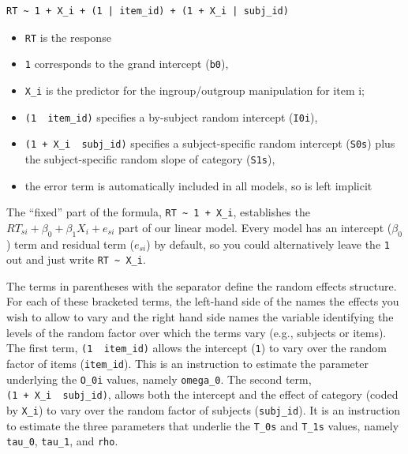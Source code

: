 \documentclass[english,doc,floatsintext]{apa6}
\providecommand{\tightlist}{%
  \setlength{\itemsep}{0pt}\setlength{\parskip}{0pt}}
\begin{document}
\begin{verbatim}
RT ~ 1 + X_i + (1 | item_id) + (1 + X_i | subj_id)
\end{verbatim}

\begin{itemize}
\tightlist
\item
  \texttt{RT} is the response
\item
  \texttt{1} corresponds to the grand intercept (\texttt{b0}),
\item
  \texttt{X\_i} is the predictor for the ingroup/outgroup manipulation for item i;
\item
  \texttt{(1\ \textbar{}\ item\_id)} specifies a by-subject random intercept (\texttt{I0i}),
\item
  \texttt{(1\ +\ X\_i\ \textbar{}\ subj\_id)} specifies a subject-specific random intercept (\texttt{S0s}) plus the subject-specific random slope of category (\texttt{S1s}),
\item
  the error term is automatically included in all models, so is left implicit
\end{itemize}

The \enquote{fixed} part of the formula, \texttt{RT\ \textasciitilde{}\ 1\ +\ X\_i}, establishes the \(RT_{si} + \beta_0 + \beta_1 X_i + e_{si}\) part of our linear model. Every model has an intercept (\(\beta_0\)) term and residual term (\(e_{si}\)) by default, so you could alternatively leave the \texttt{1} out and just write \texttt{RT\ \textasciitilde{}\ X\_i}.

The terms in parentheses with the \texttt{\textbar{}} separator define the random effects structure. For each of these bracketed terms, the left-hand side of the \texttt{\textbar{}} names the effects you wish to allow to vary and the right hand side names the variable identifying the levels of the random factor over which the terms vary (e.g., subjects or items). The first term, \texttt{(1\ \textbar{}\ item\_id)} allows the intercept (\texttt{1}) to vary over the random factor of items (\texttt{item\_id}). This is an instruction to estimate the parameter underlying the \texttt{O\_0i} values, namely \texttt{omega\_0}. The second term, \texttt{(1\ +\ X\_i\ \textbar{}\ subj\_id)}, allows both the intercept and the effect of category (coded by \texttt{X\_i}) to vary over the random factor of subjects (\texttt{subj\_id}). It is an instruction to estimate the three parameters that underlie the \texttt{T\_0s} and \texttt{T\_1s} values, namely \texttt{tau\_0}, \texttt{tau\_1}, and \texttt{rho}.
\end{document}
